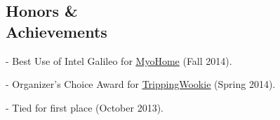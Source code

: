 \documentclass[margin]{res}
\begin{document}
\begin{minipage}{\textwidth}
\begin{resume}
 \section{Honors \& \\ Achievements}
\begin{description} \itemsep -11pt
		\item[YHack] - Best Use of Intel Galileo for \uline{\href{http://GitHub.com/VoidingWarranties/Myo-Home}{MyoHome}} (Fall 2014). \\
		\item[HackRU] - Organizer's Choice Award for \uline{\href{http://GitHub.com/VoidingWarranties/TrippingWookie}{TrippingWookie}} (Spring 2014). \\
		\item[Microsoft Coding Competition] - Tied for first place (October 2013). \\
		\item[Rensselaer Leadership Award]
\end{description}

\end{resume}
\end{minipage}
\end{document}
